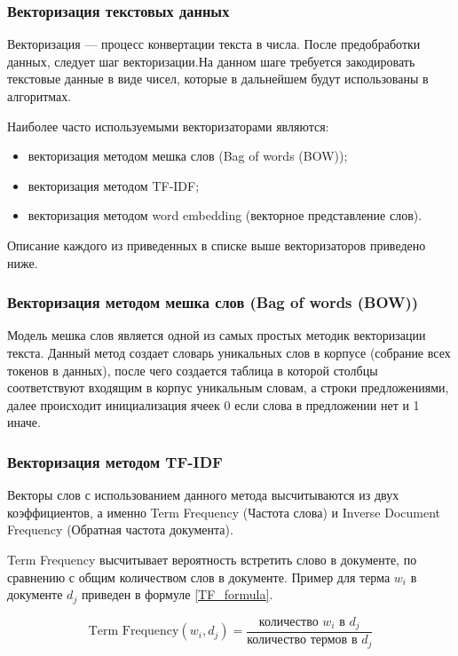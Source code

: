 \subsubsection{Векторизация текстовых данных}

Векторизация --- процесс конвертации текста в числа. После предобработки данных, следует шаг векторизации.На данном шаге требуется закодировать текстовые данные в виде чисел, которые в дальнейшем будут использованы в алгоритмах.

Наиболее часто используемыми векторизаторами являются:

\begin{itemize}
	\item векторизация методом мешка слов (Bag of words (BOW));
	\item векторизация методом TF-IDF;
	\item векторизация методом word embedding (векторное представление слов).
\end{itemize}

Описание каждого из приведенных в списке выше векторизаторов приведено ниже.

\subsubsection{Векторизация методом мешка слов (Bag of words (BOW))}

Модель мешка слов является одной из самых простых методик векторизации текста. Данный метод создает словарь уникальных слов в корпусе (собрание всех токенов в данных), после чего создается таблица в которой столбцы соответствуют входящим в корпус уникальным словам, а строки предложениями, далее происходит инициализация ячеек 0 если слова в предложении нет и 1 иначе.

\subsubsection{Векторизация методом TF-IDF}

Векторы слов с использованием данного метода высчитываются из двух коэффициентов, а именно Term Frequency (Частота слова) и Inverse Document Frequency (Обратная частота документа).

Term Frequency высчитывает вероятность встретить слово в документе, по сравнению с общим количеством слов в документе. Пример для терма $w_i$ в документе $d_j$ приведен в формуле \ref{TF_formula}.

\begin{equation}
\label{TF_formula}
\text{Term Frequency}(w_i, d_j) = \frac{\text{количество } w_i \text{ в } d_j}{\text{количество термов в } d_j}
\end{equation}

